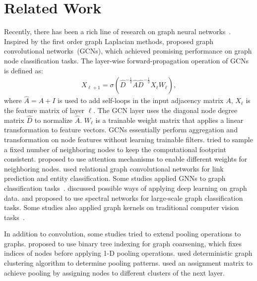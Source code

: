 \documentclass{article}
\begin{document}
\section{Related Work}

Recently, there has been a rich line of research on graph neural
networks~\citep{gilmer2017neural}. Inspired by the first order graph
Laplacian methods, \cite{kipf2016semi} proposed graph convolutional
networks~(GCNs), which achieved promising performance on graph node
classification tasks. The layer-wise forward-propagation operation
of GCNs is defined as:
\begin{equation}
\begin{aligned}
  X_{\ell+1} =
  \sigma(\hat{D}^{-\frac{1}{2}}\hat{A}\hat{D}^{-\frac{1}{2}}X_{\ell}W_{\ell}),
\end{aligned}\label{eq:gcn}
\end{equation}
where $\hat A = A + I$ is used to add self-loops in the input
adjacency matrix $A$, $X_{\ell}$ is the feature matrix of layer
$\ell$. The GCN layer uses the diagonal node degree matrix $\hat{D}$
to normalize $\hat{A}$. $W_{\ell}$ is a trainable weight matrix that
applies a linear transformation to feature vectors. GCNs essentially
perform aggregation and transformation on node features without
learning trainable filters. \cite{hamilton2017inductive} tried to
sample a fixed number of neighboring nodes to keep the computational
footprint consistent. \cite{velivckovic2017graph} proposed to use
attention mechanisms to enable different weights for neighboring
nodes. \cite{schlichtkrull2018modeling} used relational graph
convolutional networks for link prediction and entity
classification. Some studies applied GNNs to graph classification
tasks~\citep{duvenaud2015convolutional,dai2016discriminative,zhang2018end}.
\cite{bronstein2017geometric} discussed possible
ways of applying deep learning on graph data. \cite{henaff2015deep}
and \cite{bruna2014spectral} proposed to use spectral networks for
large-scale graph classification tasks. Some studies also applied
graph kernels on traditional computer vision
tasks~\citep{gama2019convolutional,fey2018splinecnn,monti2017geometric}.

In addition to convolution, some studies tried to extend pooling operations to
graphs. \cite{defferrard2016convolutional} proposed to use binary tree
indexing for graph coarsening, which fixes indices of nodes before applying
1-D pooling operations. \cite{simonovsky2017dynamic} used deterministic graph
clustering algorithm to determine pooling patterns.
\cite{ying2018hierarchical} used an assignment matrix to achieve pooling by
assigning nodes to different clusters of the next layer.
\end{document}
